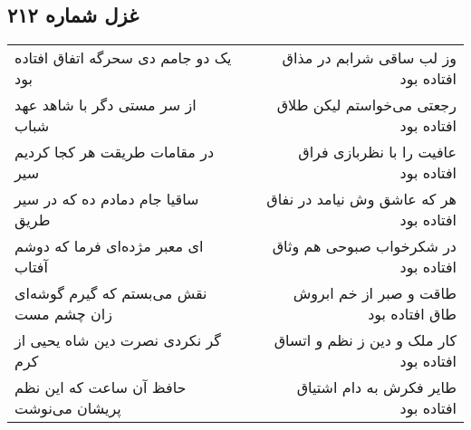 \begin{center}
\section*{غزل شماره ۲۱۲}
\label{sec:sh212}
\begin{longtable}{l p{0.5cm} r}
یک دو جامم دی سحرگه اتفاق افتاده بود
&&
وز لب ساقی شرابم در مذاق افتاده بود
\\
از سر مستی دگر با شاهد عهد شباب
&&
رجعتی می‌خواستم لیکن طلاق افتاده بود
\\
در مقامات طریقت هر کجا کردیم سیر
&&
عافیت را با نظربازی فراق افتاده بود
\\
ساقیا جام دمادم ده که در سیر طریق
&&
هر که عاشق وش نیامد در نفاق افتاده بود
\\
ای معبر مژده‌ای فرما که دوشم آفتاب
&&
در شکرخواب صبوحی هم وثاق افتاده بود
\\
نقش می‌بستم که گیرم گوشه‌ای زان چشم مست
&&
طاقت و صبر از خم ابروش طاق افتاده بود
\\
گر نکردی نصرت دین شاه یحیی از کرم
&&
کار ملک و دین ز نظم و اتساق افتاده بود
\\
حافظ آن ساعت که این نظم پریشان می‌نوشت
&&
طایر فکرش به دام اشتیاق افتاده بود
\\
\end{longtable}
\end{center}
